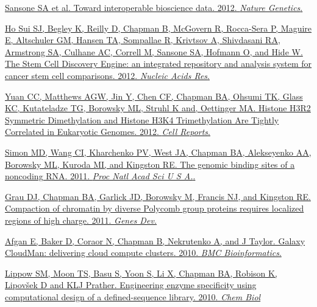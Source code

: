 \documentclass[10pt]{article}
\makeatletter
\newlength{\bibhang}
\newlength{\bibsep}
 {\@listi \global\bibsep\itemsep \global\advance\bibsep by\parsep}
\newenvironment{bibsection}%
        {\vspace{-\baselineskip}\begin{list}{}{%
       \setlength{\leftmargin}{\bibhang}%
       \setlength{\itemindent}{-\leftmargin}%
       \setlength{\itemsep}{\bibsep}%
       \setlength{\parsep}{\z@}%
        \setlength{\partopsep}{0pt}%
        \setlength{\topsep}{0pt}}}
        {\end{list}\vspace{-.6\baselineskip}}
\makeatother
\begin{document}
\begin{bibsection}
  \item \href{http://www.nature.com/ng/journal/v44/n2/full/ng.1054.html}
    {Sansone SA et al. Toward interoperable bioscience data. 2012.
    \textit{Nature Genetics}.}

  \item \href{http://nar.oxfordjournals.org/content/40/D1/D984.long}
    {Ho Sui SJ, Begley K, Reilly D, Chapman B, McGovern R, Rocca-Sera
      P, Maguire E, Altschuler GM, Hansen TA, Sompallae R, Krivtsov A,
      Shivdasani RA, Armstrong SA, Culhane AC, Correll M, Sansone SA,
      Hofmann O, and Hide W. The Stem Cell Discovery Engine: an
    integrated repository and analysis system for cancer stem cell
    comparisons. 2012. \textit{Nucleic Acids Res}.}

  \item \href{http://www.cell.com/cell-reports/abstract/S2211-1247(11)00018-0}
    {Yuan CC, Matthews AGW, Jin Y, Chen CF, Chapman BA, Ohsumi TK,
      Glass KC, Kutateladze TG, Borowsky ML,
      Struhl K and, Oettinger MA. Histone H3R2 Symmetric Dimethylation
      and Histone H3K4 Trimethylation Are Tightly Correlated in
      Eukaryotic Genomes. 2012. \textit{Cell Reports}.}

  \item \href{http://www.pnas.org/content/108/51/20497.abstract}
    {Simon MD, Wang CI, Kharchenko PV, West JA, Chapman BA,
     Alekseyenko AA, Borowsky ML, Kuroda MI, and Kingston RE.
     The genomic binding sites of a noncoding RNA. 2011.
     \textit{Proc Natl Acad Sci U S A.}.}

  \item \href{http://genesdev.cshlp.org/content/25/20/2210.abstract}
    {Grau DJ, Chapman BA, Garlick JD, Borowsky M, Francis NJ, and Kingston
    RE. Compaction of chromatin by diverse Polycomb group proteins
    requires localized regions of high charge. 2011. \textit{Genes Dev.}}

  \item \href{http://www.biomedcentral.com/1471-2105/11/S12/S4}
    {Afgan E, Baker D, Coraor N, Chapman B, Nekrutenko A, and J Taylor.
    Galaxy CloudMan: delivering cloud compute clusters. 2010. \textit{BMC
    Bioinformatics}.}

  \item \href{http://www.cell.com/chemistry-biology/retrieve/pii/S1074552110004059}
    {Lippow SM, Moon TS, Basu S, Yoon S, Li X, Chapman BA, Robison K, Lipovšek D 
    and KLJ Prather.
    Engineering enzyme specificity using computational
     design of a defined-sequence library. 2010. \textit{Chem Biol}}


\end{bibsection}
\end{document}

